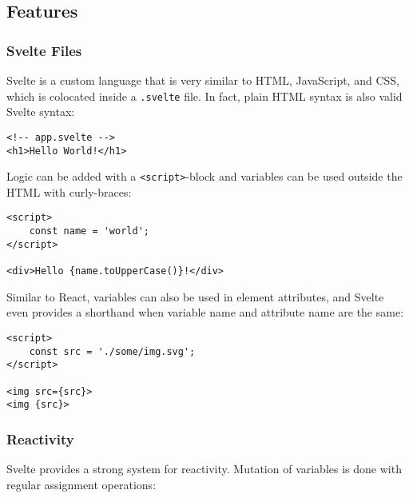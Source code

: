 \subsection{Features}

\subsubsection{Svelte Files}

Svelte is a custom language that is very similar to HTML, JavaScript, and CSS, which is colocated inside a \texttt{.svelte} file. In fact, plain HTML syntax is also valid Svelte syntax:

\begin{verbatim}
<!-- app.svelte -->
<h1>Hello World!</h1> 
\end{verbatim}
Logic can be added with a \texttt{<script>}-block and variables can be used outside the HTML with curly-braces:

\begin{verbatim}
<script>
    const name = 'world';
</script>

<div>Hello {name.toUpperCase()}!</div>
\end{verbatim}

Similar to React, variables can also be used in element attributes, and Svelte even provides a shorthand when variable name and attribute name are the same:
\begin{verbatim}
<script>
    const src = './some/img.svg';
</script>

<img src={src}>
<img {src}> 
\end{verbatim}

\subsubsection{Reactivity}

Svelte provides a strong system for reactivity. Mutation of variables is done with regular assignment operations:

